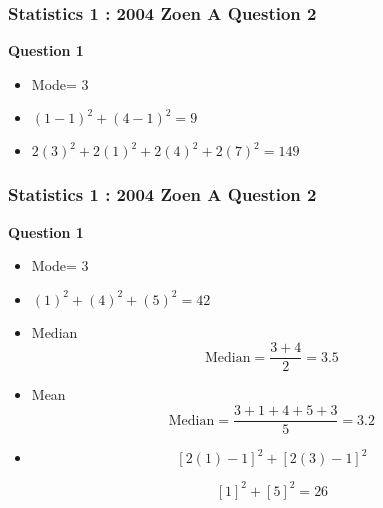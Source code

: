 \documentclass{beamer}
\begin{document}

\begin{frame}
\frametitle{Statistics 1 : 2004 Zoen A Question 2}
\Large
\vspace{-1cm}
\textbf{Question 1}
\begin{itemize}


\item Mode= 3

\item $(1-1)^2 + (4-1)^2 = 9$

\item $2(3)^2 + 2(1)^2 + 2(4)^2 + 2(7)^2 =149
$

\end{itemize}

\end{frame}
\begin{frame}
\frametitle{Statistics 1 : 2004 Zoen A Question 2}
\Large
\vspace{-1cm}
\textbf{Question 1}
\begin{itemize}


\item Mode= 3

\item $(1)^2 + (4)^2 + (5)^2 = 42$

\item Median 
\[ \mbox{Median} = \frac{3+4}{2} = 3.5 \]

\item Mean 
\[ \mbox{Median} = \frac{3+1+4+5+3}{5} = 3.2 \]

\item 
\[ \left[ 2( 1)-1 \right]^2 + \left[ 2(3 )-1 \right]^2 \] 

\[ [1]^2 + [ 5]^2 =26 \]  
\end{itemize}

\end{frame}
\end{document}
